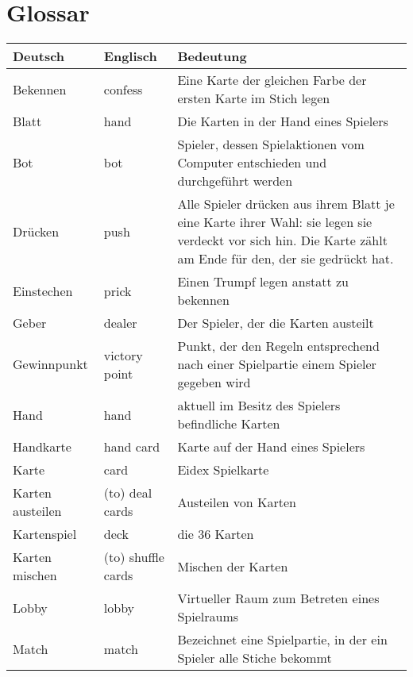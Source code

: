 \chapter{Glossar}

	\begin{center}
		\begin{longtable}{p{} p{} p{}}
			\textbf{Deutsch} & \textbf{Englisch} & \textbf{Bedeutung} \\
			\hline \hline \endhead			
			Bekennen&confess&Eine Karte der gleichen Farbe der ersten Karte im Stich legen\\
			Blatt & hand & Die Karten in der Hand eines Spielers \\
			Bot & bot & Spieler, dessen Spielaktionen vom Computer entschieden und durchgeführt werden\\
			Drücken & push & Alle Spieler drücken aus ihrem Blatt je eine Karte ihrer Wahl: sie legen sie verdeckt vor sich hin. Die Karte zählt am Ende für den, der sie gedrückt hat. \\
			Einstechen & prick & Einen Trumpf legen anstatt zu bekennen\\
			Geber & dealer & Der Spieler, der die Karten austeilt \\
			Gewinnpunkt & victory point & Punkt, der den Regeln entsprechend nach einer Spielpartie einem Spieler gegeben wird\\
			Hand & hand & aktuell im Besitz des Spielers befindliche Karten \\
			Handkarte & hand card & Karte auf der Hand eines Spielers \\
			Karte & card & Eidex Spielkarte\\
			Karten austeilen & (to) deal cards & Austeilen von Karten\\
			Kartenspiel & deck & die 36 Karten \\
			Karten mischen & (to) shuffle cards & Mischen der Karten \\
			Lobby & lobby & Virtueller Raum zum Betreten eines Spielraums\\
			Match & match & Bezeichnet eine Spielpartie, in der ein Spieler alle Stiche bekommt\\

\end{longtable}
\end{center}
